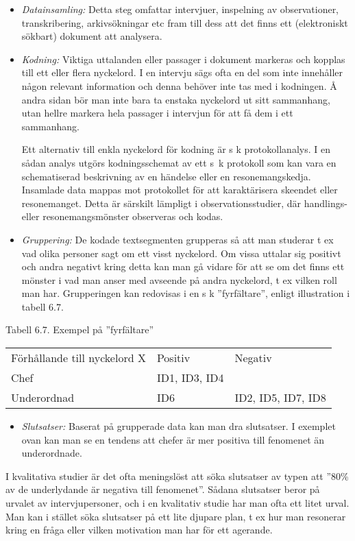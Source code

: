 \begin{itemize}
\item
  \emph{Datainsamling:} Detta steg omfattar intervjuer, inspelning av
  observationer, transkribering, arkivsökningar etc fram till dess att
  det finns ett (elektroniskt sökbart) dokument att analysera.
\item
  \emph{Kodning:} Viktiga uttalanden eller passager i dokument markeras
  och kopplas till ett eller flera nyckelord. I en intervju sägs ofta en
  del som inte innehåller någon relevant information och denna behöver
  inte tas med i kodningen. Å andra sidan bör man inte bara ta enstaka
  nyckelord ut sitt sammanhang, utan hellre markera hela passager i
  intervjun för att få dem i ett sammanhang.

  Ett alternativ till enkla nyckelord för kodning är s k
  protokollanalys. I en sådan analys utgörs kodningsschemat av ett s~k
  protokoll som kan vara en schematiserad beskrivning av en händelse
  eller en resonemangskedja. Insamlade data mappas mot protokollet för
  att karaktärisera skeendet eller resonemanget. Detta är särskilt
  lämpligt i observationsstudier, där handlings- eller
  resonemangsmönster observeras och kodas.
\item
  \emph{Gruppering:} De kodade textsegmenten grupperas så att man
  studerar t ex vad olika personer sagt om ett visst nyckelord. Om vissa
  uttalar sig positivt och andra negativt kring detta kan man gå vidare
  för att se om det finns ett mönster i vad man anser med avseende på
  andra nyckelord, t ex vilken roll man har. Grupperingen kan redovisas
  i en s k ''fyrfältare'', enligt illustration i tabell 6.7.
\end{itemize}

Tabell 6.7. Exempel på ''fyrfältare''

\begin{longtable}[]{@{}lll@{}}
\toprule
Förhållande till nyckelord X & Positiv & Negativ\tabularnewline
Chef & ID1, ID3, ID4 &\tabularnewline
Underordnad & ID6 & ID2, ID5, ID7, ID8\tabularnewline
\bottomrule
\end{longtable}

\begin{itemize}
\item
  \emph{Slutsatser:} Baserat på grupperade data kan man dra slutsatser.
  I exemplet ovan kan man se en tendens att chefer är mer positiva till
  fenomenet än underordnade.
\end{itemize}

I kvalitativa studier är det ofta meningslöst att söka slutsatser av
typen att ''80\% av de underlydande är negativa till fenomenet''. Sådana
slutsatser beror på urvalet av intervjupersoner, och i en kvalitativ
studie har man ofta ett litet urval. Man kan i stället söka slutsatser
på ett lite djupare plan, t ex hur man resonerar kring en fråga eller
vilken motivation man har för ett agerande.

